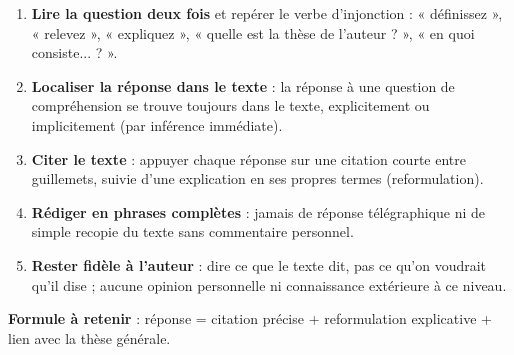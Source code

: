 \documentclass[11pt]{article}
\begin{document}
\begin{methode}
\begin{enumerate}
\item \textbf{Lire la question deux fois} et repérer le verbe d'injonction : « définissez », « relevez », « expliquez », « quelle est la thèse de l'auteur ? », « en quoi consiste... ? ».
\item \textbf{Localiser la réponse dans le texte} : la réponse à une question de compréhension se trouve toujours dans le texte, explicitement ou implicitement (par inférence immédiate).
\item \textbf{Citer le texte} : appuyer chaque réponse sur une citation courte entre guillemets, suivie d'une explication en ses propres termes (reformulation).
\item \textbf{Rédiger en phrases complètes} : jamais de réponse télégraphique ni de simple recopie du texte sans commentaire personnel.
\item \textbf{Rester fidèle à l'auteur} : dire ce que le texte dit, pas ce qu'on voudrait qu'il dise ; aucune opinion personnelle ni connaissance extérieure à ce niveau.
\end{enumerate}
\textbf{Formule à retenir} : réponse = citation précise + reformulation explicative + lien avec la thèse générale.
\end{methode}
\end{document}
